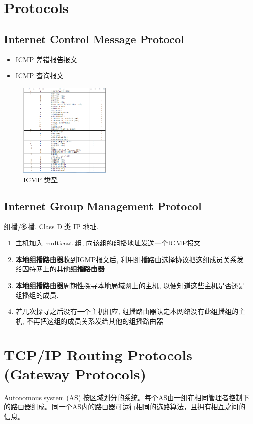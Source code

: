 \documentclass[a4paper]{report}
\begin{document}
\section{Protocols}
\subsection{Internet Control Message Protocol}
\begin{itemize}
  \item ICMP 差错报告报文
  \item ICMP 查询报文
\end{itemize}
\begin{figure}[H]
\centering
\includegraphics[width=0.4\textwidth]{icmp-message-type.png}
\caption{ICMP 类型}
\end{figure}

\subsection{Internet Group Management Protocol}
组播/多播. Class D 类 IP 地址. 
\begin{enumerate}
  \item 主机加入 multicast 组, 向该组的组播地址发送一个IGMP报文
  \item \textbf{本地组播路由器}收到IGMP报文后, 利用组播路由选择协议把这组成员关系发给因特网上的其他\textbf{组播路由器}
  \item \textbf{本地组播路由器}周期性探寻本地局域网上的主机, 以便知道这些主机是否还是组播组的成员. 
  \item 若几次探寻之后没有一个主机相应, 组播路由器认定本网络没有此组播组的主机, 不再把这组的成员关系发给其他的组播路由器
\end{enumerate}
\section{TCP/IP Routing Protocols (Gateway Protocols)}
Autonomous system (AS) 按区域划分的系统。每个AS由一组在相同管理者控制下的路由器组成。同一个AS内的路由器可运行相同的选路算法，且拥有相互之间的信息。
\end{document}
